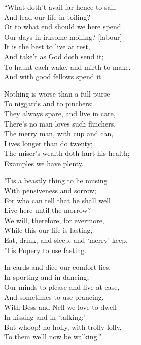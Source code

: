 

\pagebreak

\settowidth{\versewidth}{The miser’s wealth doth hurt his health;—}

\begin{dcverse}\begin{altverse}
“What doth’t avail far hence to sail,\\
And lead our life in toiling?\\
Or to what end should we here spend\\
Our days in irksome moiling? [labour]\\
It is the best to live at rest,\\
And take’t as God doth send it;\\
To haunt each wake, and mirth to make,\\
And with good fellows spend it.
\end{altverse}

\begin{altverse}
Nothing is worse than a full purse\\
To niggards and to pinchers;\\
They always spare, and live in care,\\
There’s no man loves such flinchers.\\
The merry man, with cup and can,\\
Lives longer than do twenty;\\
The miser’s wealth doth hurt his health;—\\
Examples we have plenty.
\columnbreak
\end{altverse}

\begin{altverse}
’Tis a beastly thing to lie musing\\
With pensiveness and sorrow;\\
For who can tell that he shall well\\
Live here until the morrow?\\
We will, therefore, for evermore,\\
While this our life is lasting,\\
Eat, drink, and sleep, and ‘merry’ keep,\\
’Tis Popery to use fasting.
\end{altverse}

\begin{altverse}
In cards and dice our comfort lies,\\
In sporting and in dancing,\\
Our minds to please and live at ease,\\
And sometimes to use prancing.\\
With Bess and Nell we love to dwell\\
In kissing and in ‘talking;’\\
But whoop! ho holly, with trolly lolly,\\
To them we’ll now be walking.”
\end{altverse}

\end{dcverse}

